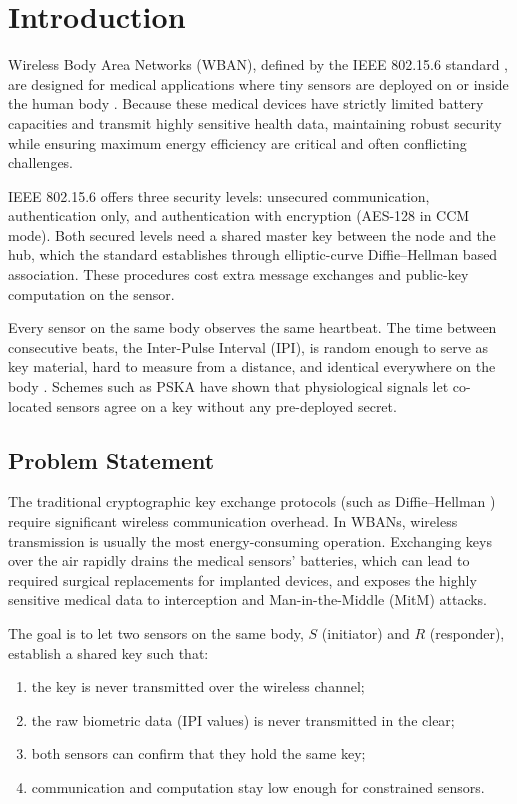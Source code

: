\section{Introduction}
Wireless Body Area Networks (WBAN), defined by the IEEE 802.15.6 standard \cite{ieee802156}, are designed for medical applications where tiny sensors are deployed on or inside the human body \cite{ullah2012survey}. Because these medical devices have strictly limited battery capacities and transmit highly sensitive health data, maintaining robust security while ensuring maximum energy efficiency are critical and often conflicting challenges.

IEEE 802.15.6 offers three security levels: unsecured communication, authentication only, and authentication with encryption (AES-128 in CCM mode). Both secured levels need a shared master key between the node and the hub, which the standard establishes through elliptic-curve Diffie--Hellman based association. These procedures cost extra message exchanges and public-key computation on the sensor.

Every sensor on the same body observes the same heartbeat. The time between consecutive beats, the Inter-Pulse Interval (IPI), is random enough to serve as key material, hard to measure from a distance, and identical everywhere on the body \cite{poon2006novel}. Schemes such as PSKA \cite{venkatasubramanian2010pska} have shown that physiological signals let co-located sensors agree on a key without any pre-deployed secret.

\subsection{Problem Statement}
The traditional cryptographic key exchange protocols (such as Diffie--Hellman \cite{diffie1976new}) require significant wireless communication overhead. In WBANs, wireless transmission is usually the most energy-consuming operation. Exchanging keys over the air rapidly drains the medical sensors' batteries, which can lead to required surgical replacements for implanted devices, and exposes the highly sensitive medical data to interception and Man-in-the-Middle (MitM) attacks.

The goal is to let two sensors on the same body, $S$ (initiator) and $R$ (responder), establish a shared key such that:
\begin{enumerate}[label=\textbf{G\arabic*.}]
  \item the key is never transmitted over the wireless channel;
  \item the raw biometric data (IPI values) is never transmitted in the clear;
  \item both sensors can confirm that they hold the same key;
  \item communication and computation stay low enough for constrained sensors.
\end{enumerate}

